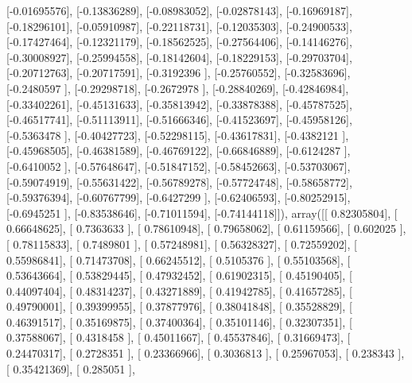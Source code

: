 \documentclass{article}
\begin{document}
       [-0.01695576],
       [-0.13836289],
       [-0.08983052],
       [-0.02878143],
       [-0.16969187],
       [-0.18296101],
       [-0.05910987],
       [-0.22118731],
       [-0.12035303],
       [-0.24900533],
       [-0.17427464],
       [-0.12321179],
       [-0.18562525],
       [-0.27564406],
       [-0.14146276],
       [-0.30008927],
       [-0.25994558],
       [-0.18142604],
       [-0.18229153],
       [-0.29703704],
       [-0.20712763],
       [-0.20717591],
       [-0.3192396 ],
       [-0.25760552],
       [-0.32583696],
       [-0.2480597 ],
       [-0.29298718],
       [-0.2672978 ],
       [-0.28840269],
       [-0.42846984],
       [-0.33402261],
       [-0.45131633],
       [-0.35813942],
       [-0.33878388],
       [-0.45787525],
       [-0.46517741],
       [-0.51113911],
       [-0.51666346],
       [-0.41523697],
       [-0.45958126],
       [-0.5363478 ],
       [-0.40427723],
       [-0.52298115],
       [-0.43617831],
       [-0.4382121 ],
       [-0.45968505],
       [-0.46381589],
       [-0.46769122],
       [-0.66846889],
       [-0.6124287 ],
       [-0.6410052 ],
       [-0.57648647],
       [-0.51847152],
       [-0.58452663],
       [-0.53703067],
       [-0.59074919],
       [-0.55631422],
       [-0.56789278],
       [-0.57724748],
       [-0.58658772],
       [-0.59376394],
       [-0.60767799],
       [-0.6427299 ],
       [-0.62406593],
       [-0.80252915],
       [-0.6945251 ],
       [-0.83538646],
       [-0.71011594],
       [-0.74144118]]), array([[ 0.82305804],
       [ 0.66648625],
       [ 0.7363633 ],
       [ 0.78610948],
       [ 0.79658062],
       [ 0.61159566],
       [ 0.602025  ],
       [ 0.78115833],
       [ 0.7489801 ],
       [ 0.57248981],
       [ 0.56328327],
       [ 0.72559202],
       [ 0.55986841],
       [ 0.71473708],
       [ 0.66245512],
       [ 0.5105376 ],
       [ 0.55103568],
       [ 0.53643664],
       [ 0.53829445],
       [ 0.47932452],
       [ 0.61902315],
       [ 0.45190405],
       [ 0.44097404],
       [ 0.48314237],
       [ 0.43271889],
       [ 0.41942785],
       [ 0.41657285],
       [ 0.49790001],
       [ 0.39399955],
       [ 0.37877976],
       [ 0.38041848],
       [ 0.35528829],
       [ 0.46391517],
       [ 0.35169875],
       [ 0.37400364],
       [ 0.35101146],
       [ 0.32307351],
       [ 0.37588067],
       [ 0.4318458 ],
       [ 0.45011667],
       [ 0.45537846],
       [ 0.31669473],
       [ 0.24470317],
       [ 0.2728351 ],
       [ 0.23366966],
       [ 0.3036813 ],
       [ 0.25967053],
       [ 0.238343  ],
       [ 0.35421369],
       [ 0.285051  ],
\end{document}
